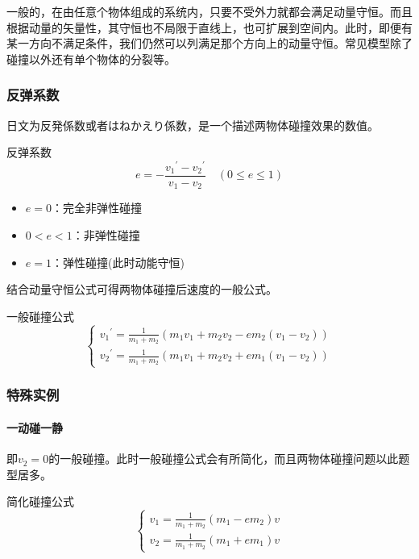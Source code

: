 一般的，在由任意个物体组成的系统内，只要不受外力就都会满足动量守恒。而且根据动量的矢量性，其守恒也不局限于直线上，也可扩展到空间内。此时，即便有某一方向不满足条件，我们仍然可以列满足那个方向上的动量守恒。常见模型除了碰撞以外还有单个物体的分裂等。

\subsubsection{反弹系数}

日文为反発係数或者はねかえり係数，是一个描述两物体碰撞效果的数值。
\begin{itembox}[l]{反弹系数}
    \begin{equation*}
        e=-\frac{{v_1}^\prime-{v_2}^\prime}{v_1-v_2}\quad(0\le e\le1)
    \end{equation*}
    \begin{itemize}
        \item $e=0$：完全非弹性碰撞
        \item $0<e<1$：非弹性碰撞
        \item $e=1$：弹性碰撞(此时动能守恒)
    \end{itemize}
\end{itembox}
结合动量守恒公式可得两物体碰撞后速度的一般公式。
\begin{itembox}[l]{一般碰撞公式}
    \begin{equation*}
        \begin{cases}
            {v_1}^\prime=\frac{1}{m_1+m_2}(m_1v_1+m_2v_2-em_2(v_1-v_2))\\
            {v_2}^\prime=\frac{1}{m_1+m_2}(m_1v_1+m_2v_2+em_1(v_1-v_2))
        \end{cases}
    \end{equation*}
\end{itembox}

\subsubsection{特殊实例}

\paragraph{一动碰一静}即$v_2=0$的一般碰撞。此时一般碰撞公式会有所简化，而且两物体碰撞问题以此题型居多。
\begin{itembox}[l]{简化碰撞公式}
    \begin{equation*}
        \begin{cases}
            v_1=\frac{1}{m_1+m_2}(m_1-em_2)v\\
            v_2=\frac{1}{m_1+m_2}(m_1+em_1)v
		\end{cases}
    \end{equation*}
\end{itembox}

